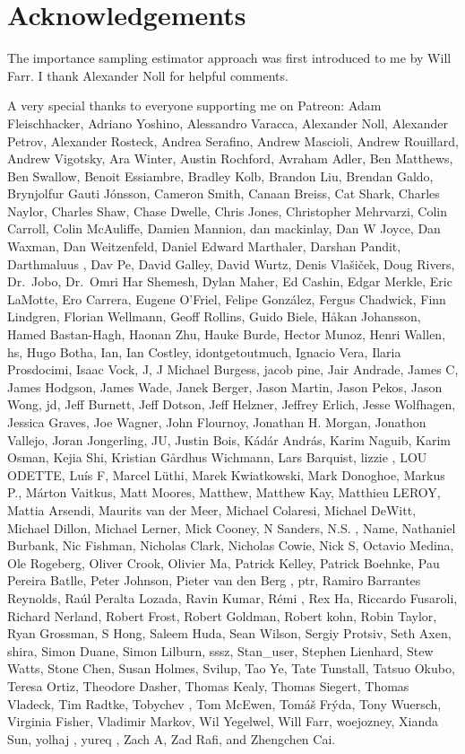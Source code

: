 \documentclass[
  letterpaper,
  DIV=11,
  numbers=noendperiod]{scrartcl}
\begin{document}
\section*{Acknowledgements}\label{acknowledgements}

The importance sampling estimator approach was first introduced to me by
Will Farr. I thank Alexander Noll for helpful comments.

A very special thanks to everyone supporting me on Patreon: Adam
Fleischhacker, Adriano Yoshino, Alessandro Varacca, Alexander Noll,
Alexander Petrov, Alexander Rosteck, Andrea Serafino, Andrew Mascioli,
Andrew Rouillard, Andrew Vigotsky, Ara Winter, Austin Rochford, Avraham
Adler, Ben Matthews, Ben Swallow, Benoit Essiambre, Bradley Kolb,
Brandon Liu, Brendan Galdo, Brynjolfur Gauti Jónsson, Cameron Smith,
Canaan Breiss, Cat Shark, Charles Naylor, Charles Shaw, Chase Dwelle,
Chris Jones, Christopher Mehrvarzi, Colin Carroll, Colin McAuliffe,
Damien Mannion, dan mackinlay, Dan W Joyce, Dan Waxman, Dan Weitzenfeld,
Daniel Edward Marthaler, Darshan Pandit, Darthmaluus , Dav Pe, David
Galley, David Wurtz, Denis Vlašiček, Doug Rivers, Dr.~Jobo, Dr.~Omri Har
Shemesh, Dylan Maher, Ed Cashin, Edgar Merkle, Eric LaMotte, Ero
Carrera, Eugene O'Friel, Felipe González, Fergus Chadwick, Finn
Lindgren, Florian Wellmann, Geoff Rollins, Guido Biele, Håkan Johansson,
Hamed Bastan-Hagh, Haonan Zhu, Hauke Burde, Hector Munoz, Henri Wallen,
hs, Hugo Botha, Ian, Ian Costley, idontgetoutmuch, Ignacio Vera, Ilaria
Prosdocimi, Isaac Vock, J, J Michael Burgess, jacob pine, Jair Andrade,
James C, James Hodgson, James Wade, Janek Berger, Jason Martin, Jason
Pekos, Jason Wong, jd, Jeff Burnett, Jeff Dotson, Jeff Helzner, Jeffrey
Erlich, Jesse Wolfhagen, Jessica Graves, Joe Wagner, John Flournoy,
Jonathan H. Morgan, Jonathon Vallejo, Joran Jongerling, JU, Justin Bois,
Kádár András, Karim Naguib, Karim Osman, Kejia Shi, Kristian Gårdhus
Wichmann, Lars Barquist, lizzie , LOU ODETTE, Luís F, Marcel Lüthi,
Marek Kwiatkowski, Mark Donoghoe, Markus P., Márton Vaitkus, Matt
Moores, Matthew, Matthew Kay, Matthieu LEROY, Mattia Arsendi, Maurits
van der Meer, Michael Colaresi, Michael DeWitt, Michael Dillon, Michael
Lerner, Mick Cooney, N Sanders, N.S. , Name, Nathaniel Burbank, Nic
Fishman, Nicholas Clark, Nicholas Cowie, Nick S, Octavio Medina, Ole
Rogeberg, Oliver Crook, Olivier Ma, Patrick Kelley, Patrick Boehnke, Pau
Pereira Batlle, Peter Johnson, Pieter van den Berg , ptr, Ramiro
Barrantes Reynolds, Raúl Peralta Lozada, Ravin Kumar, Rémi , Rex Ha,
Riccardo Fusaroli, Richard Nerland, Robert Frost, Robert Goldman, Robert
kohn, Robin Taylor, Ryan Grossman, S Hong, Saleem Huda, Sean Wilson,
Sergiy Protsiv, Seth Axen, shira, Simon Duane, Simon Lilburn, sssz,
Stan\_user, Stephen Lienhard, Stew Watts, Stone Chen, Susan Holmes,
Svilup, Tao Ye, Tate Tunstall, Tatsuo Okubo, Teresa Ortiz, Theodore
Dasher, Thomas Kealy, Thomas Siegert, Thomas Vladeck, Tim Radtke,
Tobychev , Tom McEwen, Tomáš Frýda, Tony Wuersch, Virginia Fisher,
Vladimir Markov, Wil Yegelwel, Will Farr, woejozney, Xianda Sun, yolhaj
, yureq , Zach A, Zad Rafi, and Zhengchen Cai.
\end{document}
